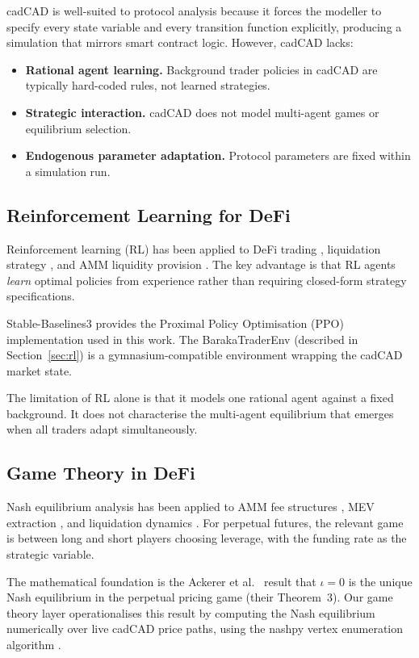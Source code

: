 \documentclass[10pt,twocolumn]{article}
\theoremstyle{plain}
\theoremstyle{definition}
\begin{document}
cadCAD is well-suited to protocol analysis because it
forces the modeller to specify every state variable and
every transition function explicitly, producing a
simulation that mirrors smart contract logic.  However,
cadCAD lacks:
\begin{itemize}[leftmargin=*,noitemsep]
\item \textbf{Rational agent learning.}  Background trader
  policies in cadCAD are typically hard-coded rules, not
  learned strategies.
\item \textbf{Strategic interaction.}  cadCAD does not
  model multi-agent games or equilibrium selection.
\item \textbf{Endogenous parameter adaptation.}  Protocol
  parameters are fixed within a simulation run.
\end{itemize}

\subsection{Reinforcement Learning for DeFi}

Reinforcement learning (RL) has been applied to DeFi
trading \cite{Ye2020}, liquidation strategy \cite{Qin2021b},
and AMM liquidity provision \cite{Heimbach2022}.
The key advantage is that RL agents \emph{learn}
optimal policies from experience rather than requiring
closed-form strategy specifications.

Stable-Baselines3 \cite{Raffin2021} provides the Proximal
Policy Optimisation (PPO) implementation used in this work.
The BarakaTraderEnv (described in Section~\ref{sec:rl})
is a gymnasium-compatible environment wrapping the cadCAD
market state.

The limitation of RL alone is that it models one rational
agent against a fixed background.  It does not characterise
the multi-agent equilibrium that emerges when all traders
adapt simultaneously.

\subsection{Game Theory in DeFi}

Nash equilibrium analysis has been applied to AMM fee
structures \cite{Lehar2021}, MEV extraction \cite{Daian2020},
and liquidation dynamics \cite{Perez2021}.
For perpetual futures, the relevant game is between long
and short players choosing leverage, with the funding rate
as the strategic variable.

The mathematical foundation is the Ackerer et al.\
\cite{Ackerer2024} result that $\iota=0$ is the unique
Nash equilibrium in the perpetual pricing game (their
Theorem~3).  Our game theory layer operationalises this
result by computing the Nash equilibrium numerically over
live cadCAD price paths, using the nashpy vertex enumeration
algorithm \cite{Knight2016}.
\end{document}
